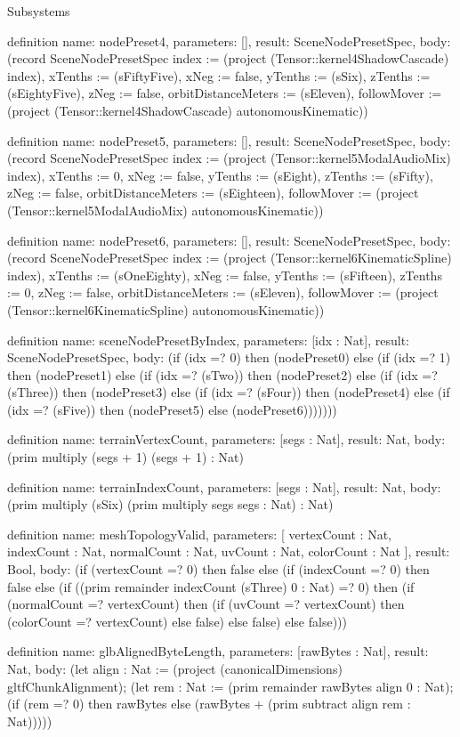 \begin{lexlean}{Subsystems}
\begin{semanticmodule}
definition{
  name: nodePreset4,
  parameters: [],
  result: SceneNodePresetSpec,
  body: (record SceneNodePresetSpec {index := (project (Tensor::kernel4ShadowCascade) index), xTenths := (sFiftyFive), xNeg := false, yTenths := (sSix), zTenths := (sEightyFive), zNeg := false, orbitDistanceMeters := (sEleven), followMover := (project (Tensor::kernel4ShadowCascade) autonomousKinematic)})
}

definition{
  name: nodePreset5,
  parameters: [],
  result: SceneNodePresetSpec,
  body: (record SceneNodePresetSpec {index := (project (Tensor::kernel5ModalAudioMix) index), xTenths := 0, xNeg := false, yTenths := (sEight), zTenths := (sFifty), zNeg := false, orbitDistanceMeters := (sEighteen), followMover := (project (Tensor::kernel5ModalAudioMix) autonomousKinematic)})
}

definition{
  name: nodePreset6,
  parameters: [],
  result: SceneNodePresetSpec,
  body: (record SceneNodePresetSpec {index := (project (Tensor::kernel6KinematicSpline) index), xTenths := (sOneEighty), xNeg := false, yTenths := (sFifteen), zTenths := 0, zNeg := false, orbitDistanceMeters := (sEleven), followMover := (project (Tensor::kernel6KinematicSpline) autonomousKinematic)})
}

definition{
  name: sceneNodePresetByIndex,
  parameters: [idx : Nat],
  result: SceneNodePresetSpec,
  body: (if (idx =? 0) then (nodePreset0) else (if (idx =? 1) then (nodePreset1) else (if (idx =? (sTwo)) then (nodePreset2) else (if (idx =? (sThree)) then (nodePreset3) else (if (idx =? (sFour)) then (nodePreset4) else (if (idx =? (sFive)) then (nodePreset5) else (nodePreset6)))))))
}

definition{
  name: terrainVertexCount,
  parameters: [segs : Nat],
  result: Nat,
  body: (prim multiply (segs + 1) (segs + 1) : Nat)
}

definition{
  name: terrainIndexCount,
  parameters: [segs : Nat],
  result: Nat,
  body: (prim multiply (sSix) (prim multiply segs segs : Nat) : Nat)
}

definition{
  name: meshTopologyValid,
  parameters: [
    vertexCount : Nat,
    indexCount : Nat,
    normalCount : Nat,
    uvCount : Nat,
    colorCount : Nat
  ],
  result: Bool,
  body: (if (vertexCount =? 0) then false else (if (indexCount =? 0) then false else (if ((prim remainder indexCount (sThree) 0 : Nat) =? 0) then (if (normalCount =? vertexCount) then (if (uvCount =? vertexCount) then (colorCount =? vertexCount) else false) else false) else false)))
}

definition{
  name: glbAlignedByteLength,
  parameters: [rawBytes : Nat],
  result: Nat,
  body: (let align : Nat := (project (canonicalDimensions) gltfChunkAlignment); (let rem : Nat := (prim remainder rawBytes align 0 : Nat); (if (rem =? 0) then rawBytes else (rawBytes + (prim subtract align rem : Nat)))))
}


\end{semanticmodule}
\end{lexlean}
